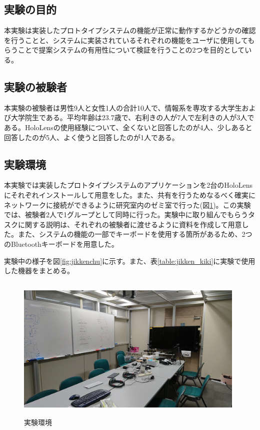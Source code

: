 \documentclass[11pt,a4j, titlepage]{jarticle} %
\begin{document}
\subsection{実験の目的}
本実験は実装したプロトタイプシステムの機能が正常に動作するかどうかの確認を行うことと、システムに実装されているそれぞれの機能をユーザに使用してもらうことで提案システムの有用性について検証を行うことの2つを目的としている。

\subsection{実験の被験者}
本実験の被験者は男性9人と女性1人の合計10人で、情報系を専攻する大学生および大学院生である。平均年齢は23.7歳で、右利きの人が7人で左利きの人が3人である。HoloLensの使用経験について、全くないと回答したのが4人、少しあると回答したのが5人、よく使うと回答したのが1人である。

\subsection{実験環境}
本実験では実装したプロトタイプシステムのアプリケーションを2台のHoloLensにそれぞれインストールして用意をした。また、共有を行うためなるべく確実にネットワークに接続ができるように研究室内のゼミ室で行った(図\ref{fig:jikken_kankyo})。この実験では、被験者2人で1グループとして同時に行った。実験中に取り組んでもらうタスクに関する説明は、それぞれの被験者に渡せるように資料を作成して用意した。また、システムの機能の一部でキーボードを使用する箇所があるため、2つのBluetoothキーボードを用意した。

実験中の様子を図\ref{fig:jikkenchu}に示す。また、表\ref{table:jikken_kiki}に実験で使用した機器をまとめる。

\begin{figure}[H]
  \begin{center}
    \includegraphics[clip,height=7.0cm,width=11.0cm]{./jikken_kankyo.eps}
    \caption{実験環境}
    \label{fig:jikken_kankyo}
  \end{center}
\end{figure}
\end{document}
